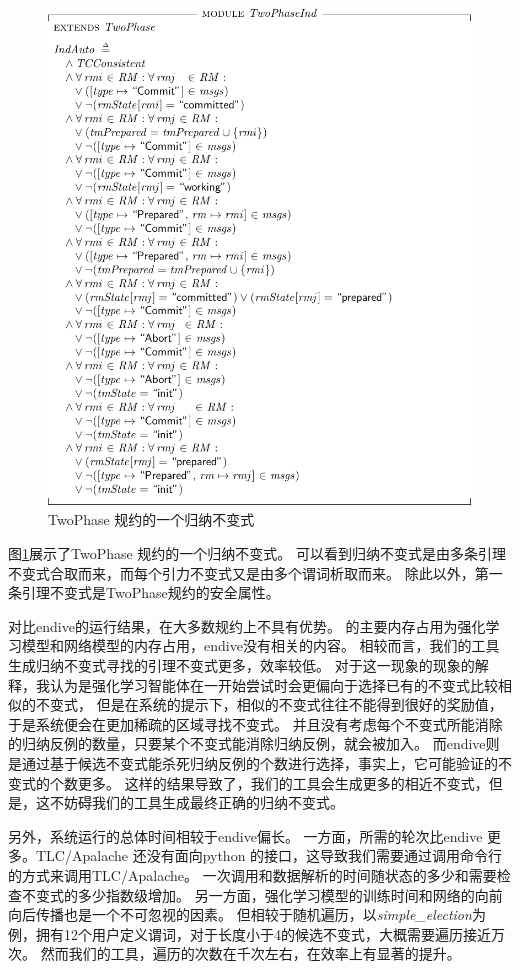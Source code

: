 \begin{figure}[!htb]
    \centering
    \includegraphics[width=0.65\linewidth]{figures/two_phase_ind.pdf}
    \caption{TwoPhase 规约的一个归纳不变式}
    \label{fig:two_phase_ind}
\end{figure}
图\ref{fig:two_phase_ind}展示了TwoPhase 规约的一个归纳不变式。
可以看到归纳不变式是由多条引理不变式合取而来，而每个引力不变式又是由多个谓词析取而来。
除此以外，第一条引理不变式是TwoPhase规约的安全属性。

对比endive的运行结果，在大多数规约上\rltla 不具有优势。
\rltla 的主要内存占用为强化学习模型和网络模型的内存占用，endive没有相关的内容。
相较而言，我们的工具生成归纳不变式寻找的引理不变式更多，效率较低。
对于这一现象的现象的解释，我认为是强化学习智能体在一开始尝试时会更偏向于选择已有的不变式比较相似的不变式，
但是在系统的提示下，相似的不变式往往不能得到很好的奖励值，于是系统便会在更加稀疏的区域寻找不变式。
并且没有考虑每个不变式所能消除的归纳反例的数量，只要某个不变式能消除归纳反例，就会被加入。
而endive则是通过基于候选不变式能杀死归纳反例的个数进行选择，事实上，它可能验证的不变式的个数更多。
这样的结果导致了，我们的工具会生成更多的相近不变式，但是，这不妨碍我们的工具生成最终正确的归纳不变式。

另外，系统运行的总体时间相较于endive偏长。
一方面，\rltla 所需的轮次比endive 更多。TLC/Apalache 还没有面向python 的接口，这导致我们需要通过调用命令行的方式来调用TLC/Apalache。
一次调用和数据解析的时间随状态的多少和需要检查不变式的多少指数级增加。
另一方面，强化学习模型的训练时间和网络的向前向后传播也是一个不可忽视的因素。
但相较于随机遍历，以\textit{simple\_election}为例，拥有12个用户定义谓词，对于长度小于4的候选不变式，大概需要遍历接近万次。
然而我们的工具，遍历的次数在千次左右，在效率上有显著的提升。

